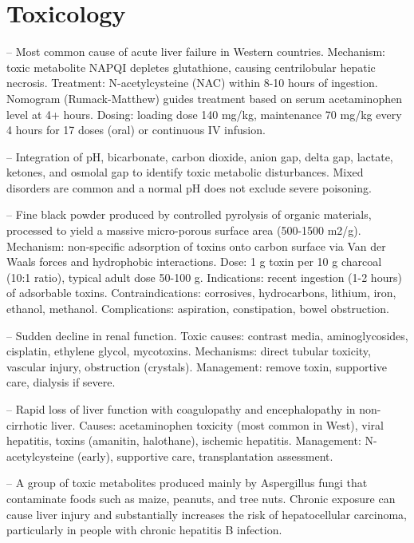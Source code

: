 \chapter{Toxicology}

-- Most common cause of acute liver failure in Western countries. Mechanism: toxic metabolite NAPQI depletes glutathione, causing centrilobular hepatic necrosis. Treatment: N-acetylcysteine (NAC) within 8-10 hours of ingestion. Nomogram (Rumack-Matthew) guides treatment based on serum acetaminophen level at 4+ hours. Dosing: loading dose 140 mg/kg, maintenance 70 mg/kg every 4 hours for 17 doses (oral) or continuous IV infusion.

-- Integration of pH, bicarbonate, carbon dioxide, anion gap, delta gap, lactate, ketones, and osmolal gap to identify toxic metabolic disturbances. Mixed disorders are common and a normal pH does not exclude severe poisoning.

-- Fine black powder produced by controlled pyrolysis of organic materials, processed to yield a massive micro-porous surface area (500-1500 m2/g). Mechanism: non-specific adsorption of toxins onto carbon surface via Van der Waals forces and hydrophobic interactions. Dose: 1 g toxin per 10 g charcoal (10:1 ratio), typical adult dose 50-100 g. Indications: recent ingestion (1-2 hours) of adsorbable toxins. Contraindications: corrosives, hydrocarbons, lithium, iron, ethanol, methanol. Complications: aspiration, constipation, bowel obstruction.

-- Sudden decline in renal function. Toxic causes: contrast media, aminoglycosides, cisplatin, ethylene glycol, mycotoxins. Mechanisms: direct tubular toxicity, vascular injury, obstruction (crystals). Management: remove toxin, supportive care, dialysis if severe.

-- Rapid loss of liver function with coagulopathy and encephalopathy in non-cirrhotic liver. Causes: acetaminophen toxicity (most common in West), viral hepatitis, toxins (amanitin, halothane), ischemic hepatitis. Management: N-acetylcysteine (early), supportive care, transplantation assessment.

-- A group of toxic metabolites produced mainly by Aspergillus fungi that contaminate foods such as maize, peanuts, and tree nuts. Chronic exposure can cause liver injury and substantially increases the risk of hepatocellular carcinoma, particularly in people with chronic hepatitis B infection.

